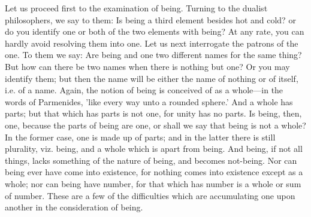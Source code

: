 \documentclass[11pt,letter]{article}
\begin{document}
\par  Let us proceed first to the examination of being. Turning to the dualist philosophers, we say to them: Is being a third element besides hot and cold? or do you identify one or both of the two elements with being? At any rate, you can hardly avoid resolving them into one. Let us next interrogate the patrons of the one. To them we say: Are being and one two different names for the same thing? But how can there be two names when there is nothing but one? Or you may identify them; but then the name will be either the name of nothing or of itself, i.e. of a name. Again, the notion of being is conceived of as a whole—in the words of Parmenides, 'like every way unto a rounded sphere.' And a whole has parts; but that which has parts is not one, for unity has no parts. Is being, then, one, because the parts of being are one, or shall we say that being is not a whole? In the former case, one is made up of parts; and in the latter there is still plurality, viz. being, and a whole which is apart from being. And being, if not all things, lacks something of the nature of being, and becomes not-being. Nor can being ever have come into existence, for nothing comes into existence except as a whole; nor can being have number, for that which has number is a whole or sum of number. These are a few of the difficulties which are accumulating one upon another in the consideration of being.
\end{document}
